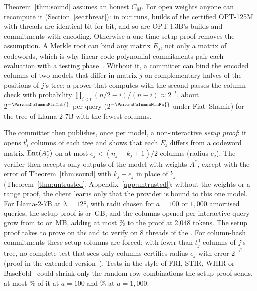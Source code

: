 Theorem~\ref{thm:sound} assumes an honest $C_M$. For open weights anyone can recompute it
(Section~\ref{sec:threat}): in our runs, builds of the certified OPT-125M with
\DigestThreadsOptS{} threads are identical bit for bit, and so are OPT-1.3B's builds and
commitments with \DigestEncodingOptM{} encoding. Otherwise a one-time setup proof removes the
assumption. A Merkle root can bind any matrix $E_j$, not only
a matrix of codewords, which is why linear-code polynomial commitments pair each evaluation with a
testing phase~\cite{ligero,brakedown}. Without it, a committer can bind the encoded columns of two
models that differ in matrix $j$ on complementary halves of the positions of $j$'s tree; a prover
that computes with the second passes the column check with probability
$\prod_{i<t}(n/2-i)/(n-i)\approx2^{-t}$, about $2^{-\ParamsColumnsMinInt{}}$ per query
($2^{-\ParamsColumnsMinFs{}}$ under Fiat--Shamir) for the tree of Llama-2-7B with the fewest
columns.

The committer then publishes, once per model, a non-interactive \emph{setup proof}: it opens
$t^0_j$ columns of each tree and shows that each $E_j$ differs from a codeword matrix
$\mathrm{Enc}(A^*_j)$ on at most $e_j<(n_j-k_j+1)/2$ columns (radius $e_j$). The verifier then accepts only outputs of the model with weights $A^*$, except with the
error of Theorem~\ref{thm:sound} with $k_j+e_j$ in place of $k_j$ (Theorem~\ref{thm:untrusted},
Appendix~\ref{app:untrusted}); without the weights or a range proof, the client learns only that
the provider is bound to this one model. For Llama-2-7B at $\lambda=128$, with radii chosen for
$a=100$ or $1{,}000$ amortised queries, the setup proof is \SetupGBLlamaA{} or \SetupGBLlamaB{}\,GB,
and the columns opened per interactive query grow from \SetupHonestMBLlama{} to
\SetupUntrustedMBLlamaA{} or \SetupUntrustedMBLlamaB{}\,MB, adding at most
\SetupQueryShareLlamaA{}\% to the proof at 2{,}048 tokens. The setup proof takes \SetupProverLlama{}
to prove on the \PlatformGpu{} and \SetupVerifierLlama{} to verify on 8 threads of the
\PlatformCpu{}. For column-hash commitments these setup columns are forced: with fewer than $t^0_j$
columns of $j$'s tree, no complete test that sees only columns certifies radius $e_j$ with
error $2^{-\beta}$ (proof in the extended version~\cite{fullversion}). Tests in the style of FRI, STIR, WHIR
or BaseFold~\cite{fri2018,stir,whir,basefold} could shrink only the random row combinations the setup
proof sends, at most \SetupCombinedShareLlamaA{}\% of it at $a=100$ and \SetupCombinedShareLlamaB{}\% at
$a=1{,}000$.

